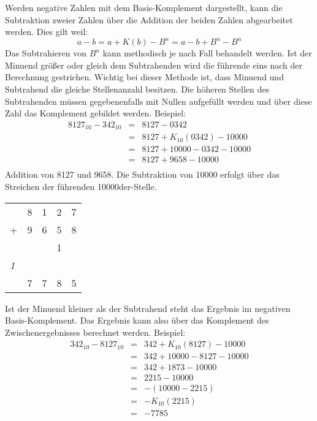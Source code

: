 Werden negative Zahlen mit dem Basis-Komplement dargestellt, kann die Subtraktion zweier Zahlen über die Addition der beiden Zahlen abgearbeitet werden. Dies gilt weil:
$$
  a - b = a + K(b) - B^n = a - b + B^n - B^n
$$
Das Subtrahieren von $B^n$ kann methodisch je nach Fall behandelt werden. Ist der Minuend größer oder gleich dem Subtrahenden  wird die führende eins nach der Berechnung gestrichen. Wichtig bei dieser Methode ist, dass Minuend und Subtrahend die gleiche Stellenanzahl besitzen. Die höheren Stellen des Subtrahenden müssen gegebenenfalls mit Nullen aufgefüllt werden und über diese Zahl das Komplement gebildet werden. Beispiel:
\begin{eqnarray*}
	8127_{10} - 342_{10} & = & 8127 - 0342                  \\
	                     & = & 8127 + K_{10}(0342) - 10000  \\
	                     & = & 8127 + 10000 - 0342 - 10000  \\
	                     & = & 8127 + 9658 - 10000  \\                
\end{eqnarray*}
Addition von 8127 und 9658. Die Subtraktion von 10000 erfolgt über das Streichen der führenden 10000der-Stelle.
\begin{center}
\begin{tabular}{lrrrr}
  & 8 & 1 & 2 & 7 \\
+ & 9 & 6 & 5 & 8 \\
\hline
  &   &   & 1 &   \\
\textit{1} &   &   &   &   \\
\hline
  & 7 & 7 & 8 & 5
\end{tabular}
\end{center}

Ist der Minuend kleiner als der Subtrahend  steht das Ergebnis im negativen Basis-Komplement. Das Ergebnis kann also über das Komplement des Zwischenergebnisses berechnet werden. Beispiel:
\begin{eqnarray*}
	342_{10} - 8127_{10} & = & 342 + K_{10}(8127) - 10000  \\
	                     & = & 342 + 10000 - 8127 - 10000  \\
	                     & = & 342 + 1873 - 10000          \\
	                     & = & 2215 - 10000                \\
	                     & = & -(10000 - 2215)             \\
	                     & = & -K_{10}(2215)               \\
	                     & = & -7785                       \\
\end{eqnarray*}

